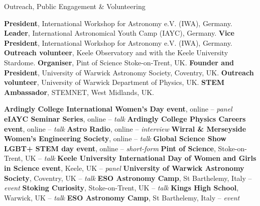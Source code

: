 \begin{rubric}{Outreach, Public Engagement \& Volunteering }

\entry*[2023 -- 2024]%
    \textbf{President}, International Workshop for Astronomy e.V. (IWA), Germany.
\entry*[2017 -- 2024]%
    \textbf{Leader}, International Astronomical Youth Camp (IAYC), Germany. 
\entry*[2021 -- 2023]%
    \textbf{Vice President}, International Workshop for Astronomy e.V. (IWA), Germany. 
\entry*[2019 -- 2022]%
    \textbf{Outreach volunteer}, Keele Observatory and with the Keele University Stardome.
\entry*[2019 -- 2020]%
    \textbf{Organiser}, Pint of Science Stoke-on-Trent, UK.
\entry*[2016 -- 2018]%
    \textbf{Founder and President}, University of Warwick Astronomy Society, Coventry, UK.
\entry*[2017 -- 2018]%
    \textbf{Outreach volunteer}, University of Warwick Department of Physics, UK. 
\entry*[2016 -- 2018]%
    \textbf{STEM Ambassador}, STEMNET, West Midlands, UK.

\entry*[2022]%
    \textbf{Ardingly College International Women's Day event}, online -- \textit{panel}
\entry*[2021]%
    \textbf{eIAYC Seminar Series}, online -- \textit{talk}
\entry*[2021]%
    \textbf{Ardingly College Physics Careers event}, online -- \textit{talk}
\entry*[2021]%
    \textbf{Astro Radio}, online -- \textit{interview}
\entry*[2020]%
    \textbf{Wirral \& Merseyside Women's Engineering Society}, online -- \textit{talk}  
\entry*[2020]%
    \textbf{Global Science Show LGBT+ STEM day event}, online -- \textit{short-form}  
\entry*[2019]%
    \textbf{Pint of Science}, Stoke-on-Trent, UK -- \textit{talk} 
\entry*[2019]%
    \textbf{Keele University International Day of Women and Girls in Science event}, Keele, UK -- \textit{panel} 
\entry*[2019]%
    \textbf{University of Warwick Astronomy Society}, Coventry, UK -- \textit{talk} 
\entry*[2018]%
    \textbf{ESO Astronomy Camp}, St Barthelemy, Italy -- \textit{event}
\entry*[2018]%
    \textbf{Stoking Curiosity}, Stoke-on-Trent, UK -- \textit{talk}
\entry*[2018]%
    \textbf{Kings High School}, Warwick, UK -- \textit{talk} 
\entry*[2017]%
    \textbf{ESO Astronomy Camp}, St Barthelemy, Italy -- \textit{event}
    
\end{rubric}